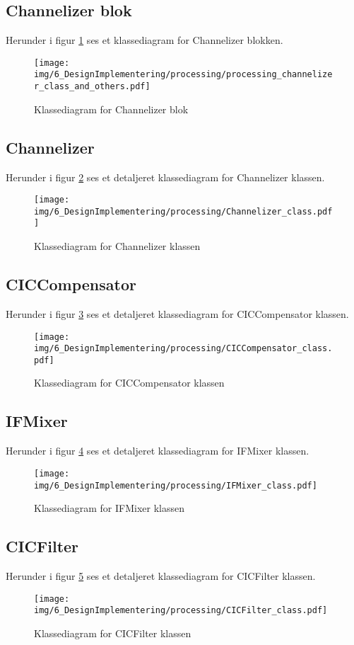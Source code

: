 \begin{appendices}
\pagebreak
\subsection{Channelizer blok}
Herunder i figur \ref{fig:Channelizer_class_others} ses et klassediagram for Channelizer blokken.
\begin{figure}[H]
	\centering
	\texttt{[image: img/6\_DesignImplementering/processing/processing\_channelizer\_class\_and\_others.pdf]}
	\caption{Klassediagram for Channelizer blok}
	\label{fig:Channelizer_class_others}
\end{figure}
\pagebreak

\subsection{Channelizer}
Herunder i figur \ref{fig:Channelizer_class} ses et detaljeret klassediagram for Channelizer klassen.
\begin{figure}[H]
	\centering
	\texttt{[image: img/6\_DesignImplementering/processing/Channelizer\_class.pdf]}
	\caption{Klassediagram for Channelizer klassen}
	\label{fig:Channelizer_class}
\end{figure}

\pagebreak
\subsection{CICCompensator}
Herunder i figur \ref{fig:CICCompensator_class} ses et detaljeret klassediagram for CICCompensator klassen.
\begin{figure}[H]
	\centering
	\texttt{[image: img/6\_DesignImplementering/processing/CICCompensator\_class.pdf]}
	\caption{Klassediagram for CICCompensator klassen}
	\label{fig:CICCompensator_class}
\end{figure}

\pagebreak
\subsection{IFMixer}
Herunder i figur \ref{fig:IFMixer_class} ses et detaljeret klassediagram for IFMixer klassen.
\begin{figure}[H]
	\centering
	\texttt{[image: img/6\_DesignImplementering/processing/IFMixer\_class.pdf]}
	\caption{Klassediagram for IFMixer klassen}
	\label{fig:IFMixer_class}
\end{figure}

\pagebreak
\subsection{CICFilter}
Herunder i figur \ref{fig:CICFilter_class} ses et detaljeret klassediagram for CICFilter klassen.
\begin{figure}[H]
	\centering
	\texttt{[image: img/6\_DesignImplementering/processing/CICFilter\_class.pdf]}
	\caption{Klassediagram for CICFilter klassen}
	\label{fig:CICFilter_class}
\end{figure}


\end{appendices}
